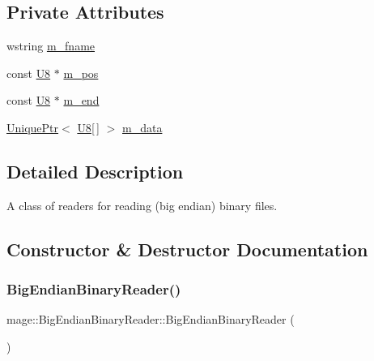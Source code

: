 \subsection*{Private Attributes}
\begin{DoxyCompactItemize}
\item 
wstring \hyperlink{classmage_1_1_big_endian_binary_reader_a0f836aec582a59f156b64bffb9653e41}{m\+\_\+fname}
\item 
const \hyperlink{namespacemage_afc638980bc6154f15af5e2d93a0e0ea9}{U8} $\ast$ \hyperlink{classmage_1_1_big_endian_binary_reader_a7dbfc5ce1712e431f75d80a4f7a56e33}{m\+\_\+pos}
\item 
const \hyperlink{namespacemage_afc638980bc6154f15af5e2d93a0e0ea9}{U8} $\ast$ \hyperlink{classmage_1_1_big_endian_binary_reader_ab4f707d30799b98afed0f9adfc27a3e2}{m\+\_\+end}
\item 
\hyperlink{namespacemage_a3316d7143a973e37adf1110f2e80ca31}{Unique\+Ptr}$<$ \hyperlink{namespacemage_afc638980bc6154f15af5e2d93a0e0ea9}{U8}\mbox{[}$\,$\mbox{]} $>$ \hyperlink{classmage_1_1_big_endian_binary_reader_a54128bdaa233c1bd20494189b2397fe3}{m\+\_\+data}
\end{DoxyCompactItemize}


\subsection{Detailed Description}
A class of readers for reading (big endian) binary files. 

\subsection{Constructor \& Destructor Documentation}
\hypertarget{classmage_1_1_big_endian_binary_reader_a1fd0dbee6950a8cb04aa399f0cdbaf2a}{}\label{classmage_1_1_big_endian_binary_reader_a1fd0dbee6950a8cb04aa399f0cdbaf2a} 
\subsubsection{\texorpdfstring{Big\+Endian\+Binary\+Reader()}{BigEndianBinaryReader()}\hspace{0.1cm}{\footnotesize\ttfamily [1/3]}}
{\footnotesize\ttfamily mage\+::\+Big\+Endian\+Binary\+Reader\+::\+Big\+Endian\+Binary\+Reader (\begin{DoxyParamCaption}{ }\end{DoxyParamCaption})\hspace{0.3cm}{\ttfamily [protected]}}

